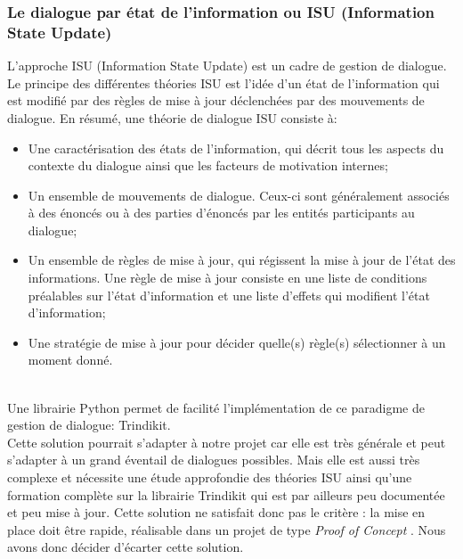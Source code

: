\subsubsection{Le dialogue par état de l'information ou ISU (Information State Update)}

L'approche ISU (Information State Update) est un cadre de gestion de dialogue. Le principe des différentes théories ISU est l'idée d'un état de l'information qui est modifié par des règles de mise à jour déclenchées par des mouvements de dialogue. En résumé, une théorie de dialogue ISU consiste à:
\begin{itemize}
	\item Une caractérisation des états de l'information, qui décrit tous les aspects du contexte du dialogue ainsi que les facteurs de motivation internes;
	\item Un ensemble de mouvements de dialogue. Ceux-ci sont généralement associés à des énoncés ou à des parties d'énoncés par les entités participants au dialogue;
	\item Un ensemble de règles de mise à jour, qui régissent la mise à jour de l'état des informations. Une règle de mise à jour consiste en une liste de conditions préalables sur l'état d'information et une liste d'effets qui modifient l'état d'information;
	\item Une stratégie de mise à jour pour décider quelle(s) règle(s) sélectionner à un moment donné.
\end{itemize}

~\\\indent
Une librairie Python permet de facilité l'implémentation de ce paradigme de gestion de dialogue: Trindikit. \\
Cette solution pourrait s'adapter à notre projet car elle est très générale et peut s'adapter à un grand éventail de dialogues possibles. Mais elle est aussi très complexe et nécessite une étude approfondie des théories ISU ainsi qu'une formation complète sur la librairie Trindikit qui est par ailleurs peu documentée et peu mise à jour. Cette solution ne satisfait donc pas le critère : \og la mise en place doit être rapide, réalisable dans un projet de type \textit{Proof of Concept} \fg. Nous avons donc décider d'écarter cette solution.

\FloatBarrier

